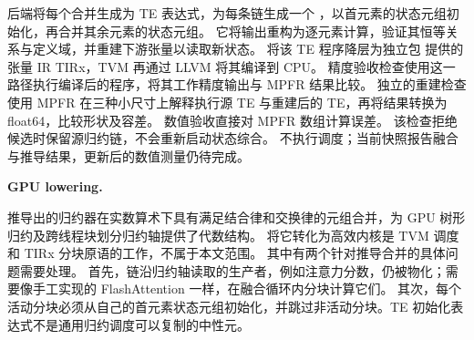 后端将每个合并生成为 TE 表达式，为每条链生成一个 \commreducer，以首元素的状态元组初始化，再合并其余元素的状态元组。
它将输出重构为逐元素计算，验证其恒等关系与定义域，并重建下游张量以读取新状态。
 将该 TE 程序降层为独立包  提供的张量 IR TIRx，TVM 再通过 LLVM 将其编译到 CPU。
精度验收检查使用这一路径执行编译后的程序，将其工作精度输出与 MPFR 结果比较。
独立的重建检查使用 MPFR 在三种小尺寸上解释执行源 TE 与重建后的 TE，再将结果转换为 float64，比较形状及容差。
数值验收直接对 MPFR 数组计算误差。
该检查拒绝候选时保留源归约链，不会重新启动状态综合。
\sys 不执行调度；当前快照报告融合与推导结果，更新后的数值测量仍待完成。

\textbf{GPU lowering.}\par
\label{sec:gpu}

\ifsubmit\else
{}
\fi
推导出的归约器在实数算术下具有满足结合律和交换律的元组合并，为 GPU 树形归约及跨线程块划分归约轴提供了代数结构。
将它转化为高效内核是 TVM 调度和 TIRx 分块原语的工作，不属于本文范围。
其中有两个针对推导合并的具体问题需要处理。
首先，链沿归约轴读取的生产者，例如注意力分数，仍被物化；需要像手工实现的 FlashAttention 一样，在融合循环内分块计算它们。
其次，每个活动分块必须从自己的首元素状态元组初始化，并跳过非活动分块。TE 初始化表达式不是通用归约调度可以复制的中性元。
